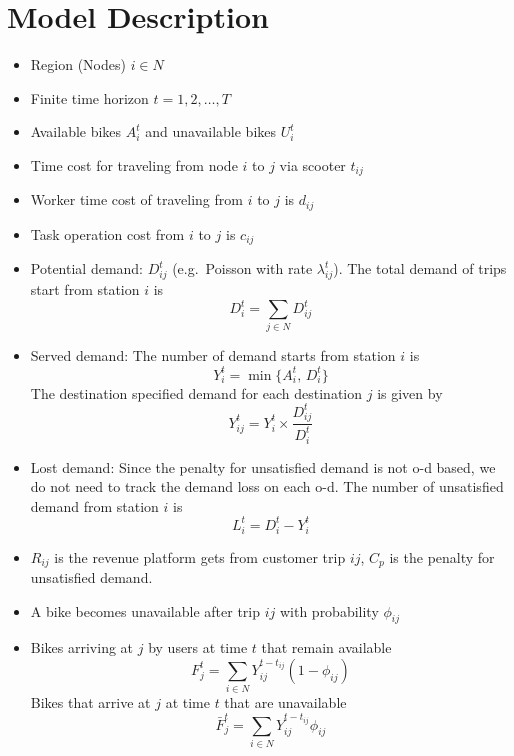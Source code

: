 \documentclass[trsc,nonblindrev]{informs3noheader}
\begin{document}

\ARTICLEAUTHORS{
\AUTHOR{}
\AFF{
\EMAIL{}}
}
\maketitle


\section{Model Description}
\begin{itemize}
    \item Region (Nodes) $i \in N$ 
    \item Finite time horizon $t=1, 2, \dots, T$
    \item Available bikes $A_{i}^t$ and unavailable bikes $U_{i}^t$
    \item Time cost for traveling from node $i$ to $j$ via scooter $t_{ij}$
    \item Worker time cost of traveling from $i$ to $j$ is $d_{ij}$
    \item Task operation cost from $i$ to $j$ is $c_{ij}$
    \item Potential demand: $D_{ij}^t$ (e.g.\ Poisson with rate $\lambda_{ij}^t$). The total demand of trips start from station $i$ is
    \[
    D_i^t={\sum_{j \in N}D_{ij}^t}
    \]
    \item Served demand: The number of demand starts from station $i$ is
    \[
    Y_i^t = \min\{A_{i}^t,\, D_i^t\}
    \]
    The destination specified demand for each destination $j$ is given by
    \[
    Y_{ij}^t = Y_i^t \times {\frac{D_{ij}^t}{D_i^t}}
    \]
   
    \item Lost demand: 
    Since the penalty for unsatisfied demand is not o-d based, we do not need to track the demand loss on each o-d. The number of unsatisfied demand from station $i$ is
    \[
      L_{i}^t = D_i^t - Y_i^t
    \]
    \item $R_{ij}$ is the revenue platform gets from customer trip $ij$, $C_p$ is the penalty for unsatisfied demand.
    
    \item A bike becomes unavailable after trip $ij$ with probability $\phi_{ij}$
    \item Bikes arriving at $j$ by users at time $t$ that remain available 
    \[F_j^t = \sum_{i \in N} Y_{ij}^{t- t_{ij}}(1-\phi_{ij})\]Bikes that arrive at $j$ at time $t$ that are unavailable 
    \[\bar{F}_{j}^t = \sum_{i \in N} Y_{ij}^{t- t_{ij}}\phi_{ij}\]
    

\end{itemize}
\end{document}
